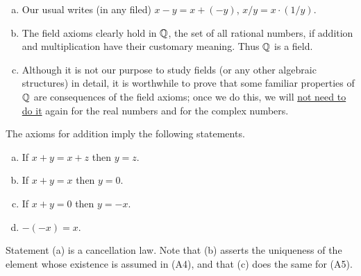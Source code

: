 \begin{myremark}
    \label{myremark:1.13}
    \begin{enumerate}[(a)]
        \item Our usual writes (in any filed) $x-y = x+(-y)$, $x/y=x\cdot (1/y)$.
        \item The field axioms clearly hold in ${\protect\mathbb Q} $, 
        the set of all rational numbers, 
        if addition and multiplication have their customary meaning. 
        Thus ${\protect\mathbb Q} $ is a field.
        \item Although it is not our purpose to study fields 
        (or any other algebraic structures) in detail, 
        it is worthwhile to prove that some familiar properties of ${\protect\mathbb Q} $ are consequences of the field axioms; 
        once we do this, we will \underline{not need to do it} again for the real numbers and for the complex numbers.
    \end{enumerate}
\end{myremark}
 


\begin{myProposition}
    \label{myProposition:1.14}
    The axioms for addition imply the following statements.
    \begin{enumerate}[(a)]
        \item If $x+y=x+z$ then $y=z$.
        \item If $x+y=x$ then $y=0$.
        \item If $x+y=0$ then $y= -x$.
        \item $-(-x)=x$.
    \end{enumerate}
\end{myProposition}

Statement (a) is a cancellation law. 
Note that (b) asserts the uniqueness of the element 
whose existence is assumed in (A4), 
and that (c) does the same for (A5).



